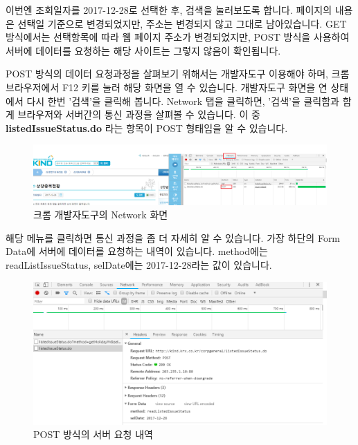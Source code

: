 \documentclass[]{book}
\begin{document}
이번엔 조회일자를 2017-12-28로 선택한 후, 검색을 눌러보도록 합니다. 페이지의 내용은 선택일 기준으로 변경되었지만, 주소는 변경되지 않고 그대로 남아있습니다. GET 방식에서는 선택항목에 따라 웹 페이지 주소가 변경되었지만, POST 방식을 사용하여 서버에 데이터를 요청하는 해당 사이트는 그렇지 않음이 확인됩니다.

POST 방식의 데이터 요청과정을 살펴보기 위해서는 개발자도구 이용해야 하며, 크롬 브라우저에서 F12 키를 눌러 해당 화면을 열 수 있습니다. 개발자도구 화면을 연 상태에서 다시 한번 '검색'을 클릭해 봅니다. Network 탭을 클릭하면, '검색'을 클릭함과 함게 브라우저와 서버간의 통신 과정을 살펴볼 수 있습니다. 이 중 \textbf{listedIssueStatus.do} 라는 항목이 POST 형태임을 알 수 있습니다.

\begin{figure}

{\centering \includegraphics{images/crawl_corp_list_2} 

}

\caption{크롬 개발자도구의 Network 화면}\label{fig:unnamed-chunk-5}
\end{figure}

해당 메뉴를 클릭하면 통신 과정을 좀 더 자세히 알 수 있습니다. 가장 하단의 Form Data에 서버에 데이터를 요청하는 내역이 있습니다. method에는 readListIssueStatus, selDate에는 2017-12-28라는 값이 있습니다.

\begin{figure}

{\centering \includegraphics{images/crawl_corp_list_3} 

}

\caption{POST 방식의 서버 요청 내역}\label{fig:unnamed-chunk-6}
\end{figure}
\end{document}
